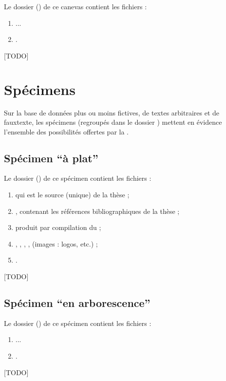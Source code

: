 Le dossier () de ce canevas contient les fichiers :
\begin{enumerate}
\item ...
\item {}.
\end{enumerate}

[TODO]

\section{Spécimens}
\label{sec-specimens}

Sur la base de données plus ou moins fictives, de textes arbitraires et de
\gls{fauxtexte}, les spécimens (regroupés dans le dossier )
mettent en évidence l'ensemble des possibilités offertes par la \yatCl{}.

\subsection{Spécimen \enquote{à plat}}
\label{sec-specimen-a-plat}

Le dossier () de ce spécimen contient les fichiers :
\begin{enumerate}
\item {} qui est le source  (unique) de la thèse ;
\item {}, contenant les références bibliographiques de
  la thèse ;
\item {} produit par compilation du  ;
\item {}, , , ,
   (images : logos, etc.) ;
\item {}.
\end{enumerate}

[TODO]

\subsection{Spécimen \enquote{en arborescence}}
\label{sec-specimen-arborescence}

Le dossier () de ce spécimen contient les
fichiers :
\begin{enumerate}
\item ...
\item {}.
\end{enumerate}

[TODO]

%
\iffalse
\fi
